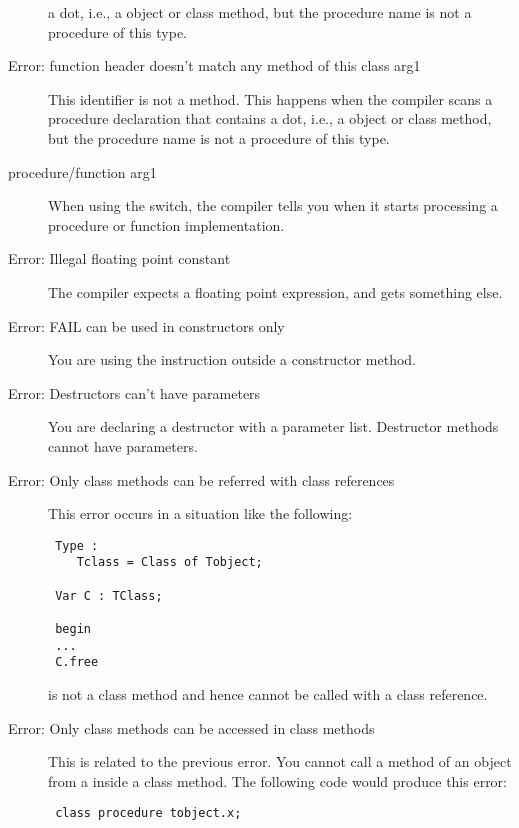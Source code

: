 \begin{description}
 a dot, i.e., a object or class method, but the procedure name is not a
 procedure of this type.
\item [Error: function header doesn't match any method of this class arg1]
 This identifier is not a method.
 This happens when the compiler scans a procedure declaration that contains
 a dot, i.e., a object or class method, but the procedure name is not a
 procedure of this type.
\item [procedure/function arg1]
 When using the  switch, the compiler tells you when it starts
 processing a procedure or function implementation.
\item [Error: Illegal floating point constant]
 The compiler expects a floating point expression, and gets something else.
\item [Error: FAIL can be used in constructors only]
 You are using the  instruction outside a constructor method.
\item [Error: Destructors can't have parameters]
 You are declaring a destructor with a parameter list. Destructor methods
 cannot have parameters.
\item [Error: Only class methods can be referred with class references]
 This error occurs in a situation like the following:
 \begin{verbatim}
 Type :
    Tclass = Class of Tobject;

 Var C : TClass;

 begin
 ...
 C.free
 \end{verbatim}
  is not a class method and hence cannot be called with a class
 reference.
\item [Error: Only class methods can be accessed in class methods]
 This is related to the previous error. You cannot call a method of an object
 from a inside a class method. The following code would produce this error:
 \begin{verbatim}
 class procedure tobject.x;


\end{verbatim}
\end{description}
